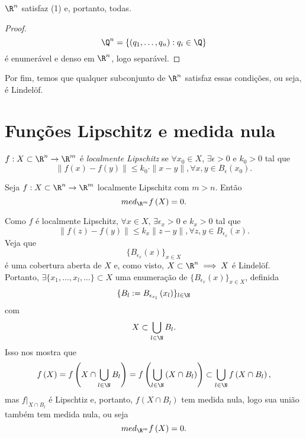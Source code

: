 \begin{corollary}
    $\R^{n}$ satisfaz (1) e, portanto, todas.
\end{corollary}

\begin{proof}
    \[
    \Q^{n} = \{\left( q_1,\ldots,q_n \right) : q_i \in \Q\} 
    \] é enumerável e denso em $\R^{n}$, logo separável.
\end{proof}

Por fim, temos que qualquer subconjunto de $\R^{n}$ satisfaz essas condições, ou seja, é Lindelöf.

\section*{Funções Lipschitz e medida nula}

\begin{definition}
    $f: X\subset \R^{n} \to \R^{m}$ é \emph{localmente Lipschitz} se $\forall x_0\in X$, $\exists \epsilon>0$ e $k_0>0$ tal que \[
    \|f\left( x \right) -f\left( y \right) \|\le k_0\cdot \|x-y\|, \forall x,y\in B_{\epsilon}\left( x_0 \right) 
    .\] 
\end{definition}

\begin{prop}
    Seja $f: X\subset \R^{n} \to  \R^{m}$ localmente Lipschitz com $m>n$. Então \[
    med_{\R^{m}}f\left( X \right) =0
    .\] 
\end{prop}

\begin{demo}
    Como $f$ é localmente Lipschitz, $\forall x\in X$, $\exists \epsilon_x > 0$ e $k_x > 0$ tal que \[
    \|f\left( z \right) -f\left( y \right) \|\le k_x \|z-y\|, \forall z,y \in B_{\epsilon_x}\left( x \right) 
    .\] Veja que \[
    \{B_{\epsilon_x}\left( x \right) \} _{x\in X}
    \] é uma cobertura aberta de $X$ e, como visto, $X\subset \R^{n} \implies X$ é Lindelöf. Portanto, $\exists \{x_1,\ldots,x_l,\ldots\} \subset X$ uma enumeração de $\{B_{\epsilon_x}\left( x \right) \} _{x\in X}$, definida \[
    \{B_l := B_{\epsilon_{x_l}}\left( x_l \right)\} _{l\in \N}
    \]  com \[
    X \subset \bigcup_{l\in \N} B_l
    .\] Isso nos mostra que \[
    f\left( X \right) = f\left( X\cap \bigcup_{l\in \N} B_l \right) = f\left( \bigcup_{l\in \N} \left( X\cap B_l \right)  \right) \subset \bigcup_{l\in \N} f\left( X\cap B_l \right) 
    ,\] mas $f|_{X\cap B_l}$ é Lipschtiz e, portanto, $f\left( X\cap B_l \right) $ tem medida nula, logo sua união também tem medida nula, ou seja \[
    med_{\R^{m}}f\left( X \right) = 0
    .\] 
\end{demo}

